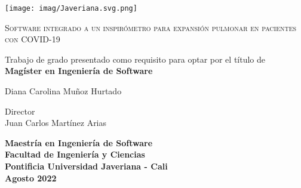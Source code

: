\begin{titlepage}
	\centering
	\texttt{[image: imag/Javeriana.svg.png]}\par\vspace{1cm}
	{\scshape\large Software integrado a un inspirómetro para expansi\'on pulmonar en pacientes con COVID-19 \par}
	\vspace{2cm}
	{ Trabajo de grado presentado como requisito para optar por el título de \\
    \textbf{Magíster en Ingeniería de Software}\par}
	\vspace{1cm}
	
	{ Diana Carolina Mu\~noz Hurtado\par}
	\vspace{0.2cm}
	Director\\
	Juan Carlos Mart\'inez Arias

	\vspace{2cm}
    
    {\bfseries Maestría en Ingeniería de Software \\
    Facultad de Ingenier\'ia y Ciencias\\
    Pontificia Universidad Javeriana - Cali\\
    \vspace{1.2cm}
    Agosto 2022\par}
    
\end{titlepage}